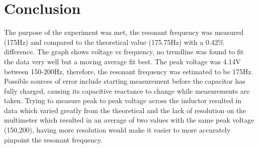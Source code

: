 \documentclass[letterpaper, 12pt]{article}
\begin{document}
\section*{Conclusion}
The purpose of the experiment was met, the resonant frequency was measured (175Hz) and compared to the theoretical value (175.75Hz)
with a 0.42\% difference. The graph shows voltage vs frequency, no trendline was found to fit the data very well but a 
moving average fit best. The peak voltage was 4.14V between 150-200Hz, therefore, the resonant frequency was estimated to be 175Hz.
Possible sources of error include starting measurement before the capacitor has fully charged, causing its capacitive reactance to change 
while measurements are taken. Trying to measure peak to peak voltage across the inductor resulted in data which varied greatly
from the theoretical and the lack of resolution on the multimeter which resulted in an average of two values with the same peak voltage 
(150,200), having more resolution would make it easier to more accurately pinpoint the resonant frequency.
\end{document}
